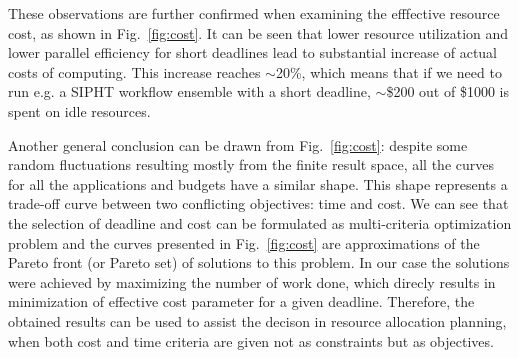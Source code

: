 \documentclass{sig-alternate}
\begin{document}
These observations are further confirmed when examining the efffective resource
cost, as shown in Fig.~\ref{fig:cost}. It can be seen that lower resource
utilization and lower parallel efficiency for short deadlines lead to
substantial increase of actual costs of computing. This increase reaches
$\sim$20\%, which means that if we need to run e.g. a SIPHT workflow ensemble
with a short deadline, $\sim$\$200 out of \$1000 is spent on idle resources.

Another general conclusion can be drawn from Fig.~\ref{fig:cost}: despite some
random fluctuations resulting mostly from the finite result space, all the
curves for all the applications and budgets have a similar shape. This shape
represents a trade-off curve between two conflicting objectives: time and cost.
We can see that the selection of deadline and cost can be formulated as
multi-criteria optimization problem and the curves presented in
Fig.~\ref{fig:cost} are approximations of the Pareto front (or Pareto set) of
solutions to this problem. In our case the solutions were achieved by maximizing
the number of work done, which direcly results in minimization of effective cost parameter for a given
deadline. Therefore, the obtained results can be used to assist the decison in
resource allocation planning, when both cost and time criteria are given not as
constraints but as objectives.


       
\end{document}
